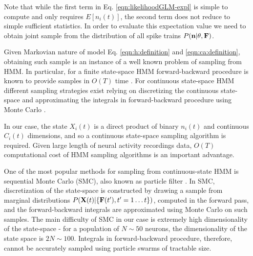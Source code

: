 Note that while the first term in Eq. \eqref{eqn:likelihoodGLM-expl} is simple to compute and only requires  $E[n_i(t)]$, the second term does not reduce to simple sufficient statistics. In order to evaluate this expectation value we need to obtain joint sample from the distribution of all spike trains $P({\bf n}|\mathbf{\theta}, {\bf F})$.

Given Markovian nature of model Eq. \eqref{eqn:h:definition} and \eqref{eqn:ca:definition}, obtaining such sample is an instance of a well known problem of sampling from HMM. In particular, for a finite state-space HMM forward-backward procedure is known to provide samples in  $O(T)$ time \cite{RAB89}. For continuous state-space HMM different sampling strategies exist relying on discretizing the continuous state-space and approximating the integrals in forward-backward procedure using Monte Carlo \cite{DFG01, MINKAPHD, Fearnhead2003, koyama08, Andrieu2007, NBR03}.

In our case, the state $X_i(t)$ is a direct product of binary $n_i(t)$ and continuous $C_i(t)$ dimensions, and so a continuous state-space sampling algorithm is required.
Given large length of neural activity recordings data, $O(T)$ computational cost of HMM sampling algorithms is an important advantage.

One of the most popular methods for sampling from continuous-state HMM is sequential Monte Carlo (SMC), also known as particle filter \cite{DFG01}. In SMC, discretization of the state-space is constructed by drawing a sample from marginal distributions  $P({\bf X}(t)|\{{\bf F}(t'), t'=1\ldots t\})$, computed in the forward pass, and the forward-backward integrals are approximated using Monte Carlo on such samples. The main difficulty of SMC in our case is extremely high dimensionality of the state-space - for a population of $N\sim 50$ neurons, the dimensionality of the state space is $2N\sim 100$. Integrals in forward-backward procedure, therefore, cannot be accurately sampled using particle swarms of tractable size.

